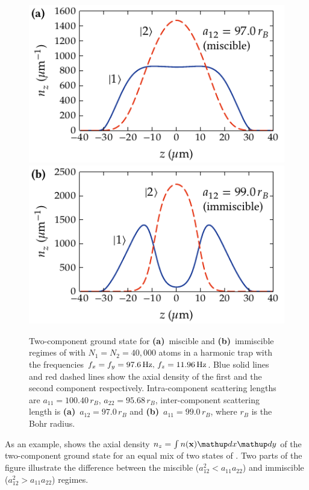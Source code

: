 \begin{figure}
\centerline{%
\includegraphics{figures_generated/mean_field/two_comp_gs_miscible.pdf}%
\includegraphics{figures_generated/mean_field/two_comp_gs_immiscible.pdf}}

\caption[Two-component ground state for miscible and immiscible regimes]{
Two-component ground state for \textbf{(a)}~miscible and \textbf{(b)}~immiscible regimes of \Rb{}  with $N_1 = N_2 = 40,000$ atoms in a  harmonic trap with the frequencies $f_x = f_y = 97.6\mbox{\ensuremath{\,\mathrm{Hz}}},\,f_z = 11.96\mbox{\ensuremath{\,\mathrm{Hz}}}$.
Blue solid lines and red dashed lines show the axial density of the first and the second component respectively.
Intra-component scattering lengths are $a_{11} = 100.40\,r_B$, $a_{22} = 95.68\,r_B$, inter-component scattering length is \textbf{(a)}~$a_{12} = 97.0\,r_B$ and \textbf{(b)}~$a_{11} = 99.0\,r_B$, where $r_B$ is the Bohr radius.}%
\label{fig:bec-noise:mean-field:two-comp-gs}
\end{figure}

As an example,  shows the axial density $n_z = \int n(\xvec) \upd x \upd y$ of the two-component ground state for an equal mix of two states of \Rb{} .
Two parts of the figure illustrate the difference between the miscible ($a_{12}^2 < a_{11} a_{22}$) and immiscible ($a_{12}^2 > a_{11} a_{22}$) regimes.


